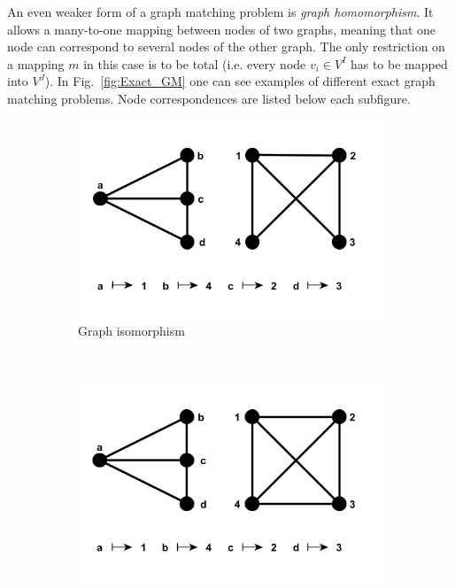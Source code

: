 An even weaker form of a graph matching problem is \emph{graph homomorphism}. It allows a many-to-one mapping between nodes of two graphs, meaning that one node can correspond to several nodes of the other graph. The only restriction on a mapping $m$ in this case is to be total (i.e. every node $v_i\in V^I$ has to be mapped into $V^J$).
In Fig.~\ref{fig:Exact_GM} one can see examples of different exact graph matching problems. Node correspondences are listed below each subfigure.
\begin{figure}[h!]
    \centering
    \begin{subfigure}[b]{0.3\textwidth}
        \includegraphics[width=\textwidth]{chapter1/fig/GI}
        \caption{Graph isomorphism}
        \label{fig:GI}
    \end{subfigure}
    ~
    \begin{subfigure}[b]{0.3\textwidth}
        \includegraphics[width=\textwidth]{chapter1/fig/monomorphism}

\end{subfigure}
\end{figure}

